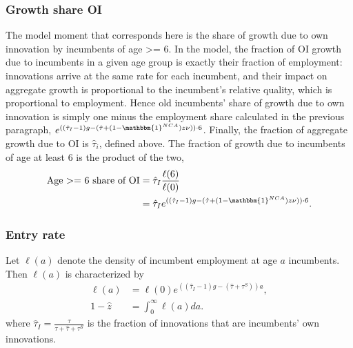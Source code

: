 \documentclass[11pt,english]{article}
\theoremstyle{definition}
\begin{document}
\subsubsection{Growth share OI}\label{appendix:calibration:growthShareOI}

The model moment that corresponds here is the share of growth due to own innovation by incumbents of age >= 6. In the model, the fraction of OI growth due to incumbents in a given age group is exactly their fraction of employment: innovations arrive at the same rate for each incumbent, and their impact on aggregate growth is proportional to the incumbent's relative quality, which is proportional to employment. Hence old incumbents' share of growth due to own innovation is simply one minus the employment share calculated in the previous paragraph, $e^{((\hat{\tau}_I -1)g - (\hat{\tau} + (1-\mathbbm{1}^{NCA})z \nu))\cdot 6}$. Finally, the fraction of aggregate growth due to OI is $\hat{\tau}_i$, defined above. The fraction of growth due to incumbents of age at least 6 is the product of the two, 
\begin{align*}
\textrm{Age >= 6 share of OI} &= \hat{\tau}_I \frac{\ell(6)}{\ell(0)} \\
&= \hat{\tau}_I e^{((\hat{\tau}_I -1)g - (\hat{\tau} + (1-\mathbbm{1}^{NCA})z \nu))\cdot 6}.
\end{align*}


\subsubsection{Entry rate}\label{appendix:calibration:entryRate}

Let $\ell(a)$ denote the density of incumbent employment at age $a$ incumbents. Then $\ell(a)$ is characterized by 
\begin{align*}
\ell(a) &= \ell(0)e^{((\hat{\tau}_I -1)g - (\hat{\tau} + \tau^S))a}, \\
1 - \hat{z} &= \int_0^{\infty} \ell(a) da.
\end{align*}
where $\hat{\tau}_I = \frac{\tau}{\tau + \hat{\tau} + \tau^S}$ is the fraction of innovations that are incumbents' own innovations. 
\end{document}
